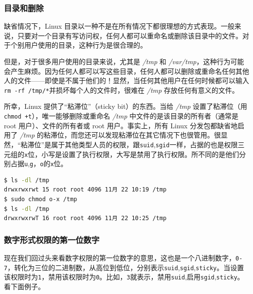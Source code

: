 \documentclass[doctor,openright,twoside]{sjtuthesis}
\newcommand{\passthrough}[1]{#1}
\theoremstyle{plain}
\theoremstyle{definition}
\theoremstyle{remark}
\theoremstyle{ocrenumbox}
\theoremstyle{plain}
\newcommand\cqh{“}
\newcommand\cqt{”}
\begin{document}
\subsubsection{目录和删除}

缺省情况下，Linux
目录以一种不是在所有情况下都很理想的方式表现。一般来说，只要对一个目录有写访问权，任何人都可以重命名或删除该目录中的文件。对于个别用户使用的目录，这种行为是很合理的。

但是，对于很多用户使用的目录来说，尤其是 \emph{/tmp} 和
\emph{/var/tmp}，这种行为可能会产生麻烦。因为任何人都可以写这些目录，任何人都可以删除或重命名任何其他人的文件------即使是不属于他们的！显然，当任何其他用户在任何时候都可以输入\passthrough{\lstinline!rm -rf /tmp/*!}并损坏每个人的文件时，很难在
\emph{/tmp} 存放任何有意义的文件。

所幸，Linux 提供了\cqh 粘滞位\cqt （sticky bit）的东西。当给 \emph{/tmp}
设置了粘滞位（用\passthrough{\lstinline!chmod +t!}），唯一能够删除或重命名
\emph{/tmp} 中文件的是该目录的所有者（通常是 root 用户）、文件的所有者或
root 用户。事实上，所有 Linux 分发包都缺省地启用了 \emph{/tmp}
的粘滞位，而您还可以发现粘滞位在其它情况下也很管用。很显然，\cqh 粘滞位\cqt 是属于其他类型人员的权限，跟\passthrough{\lstinline!suid!},\passthrough{\lstinline!sgid!}一样，占据的也是权限三元组的\passthrough{\lstinline!x!}位，小写是设置了执行权限，大写是禁用了执行权限。所不同的是他们分别占据\passthrough{\lstinline!u!},\passthrough{\lstinline!g!}，\passthrough{\lstinline!o!}的\passthrough{\lstinline!x!}位。

\begin{lstlisting}[language=bash]
$ ls -dl /tmp
drwxrwxrwt 15 root root 4096 11月 22 10:19 /tmp
$ sudo chmod o-x /tmp
$ ls -dl /tmp
drwxrwxrwT 16 root root 4096 11月 22 10:25 /tmp
\end{lstlisting}

\subsubsection{数字形式权限的第一位数字}

现在我们回过头来看数字权限的第一位数字的意思，这也是一个八进制数字，\passthrough{\lstinline!0-7!}，转化为三位的二进制数，从高位到低位，分别表示\passthrough{\lstinline!suid!},\passthrough{\lstinline!sgid!},\passthrough{\lstinline!sticky!}。当设置该权限时为\passthrough{\lstinline!1!}，禁用该权限时为\passthrough{\lstinline!0!}。比如，\passthrough{\lstinline!3!}就表示，禁用\passthrough{\lstinline!suid!},启用\passthrough{\lstinline!sgid!},\passthrough{\lstinline!sticky!}。看下面例子。
\end{document}
